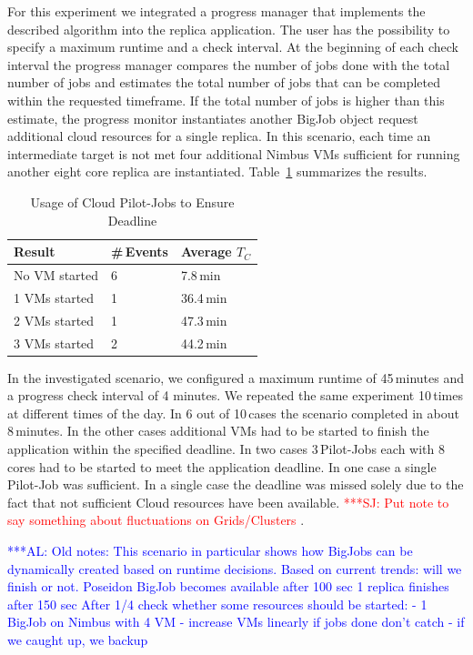 \documentclass[conference,final]{IEEEtran}
\newcommand{\tc}{$T_{C}$ }
\newcommand{\alnote}[1]{ {\textcolor{blue} { ***AL: #1 }}}
\newcommand{\jhanote}[1]{ {\textcolor{red} { ***SJ: #1 }}}
\newcommand{\alnote}[1]{}
\newcommand{\jhanote}[1]{}
\begin{document}
For this experiment we integrated a progress manager that implements
the described algorithm into the replica application.
The user has the possibility to specify a maximum runtime and a check interval.
At the beginning of each check interval the progress manager compares the number 
of jobs done with the total number of jobs and estimates the total 
number of jobs that can be completed within the requested timeframe. If the total
number of jobs is higher than this estimate, the progress monitor instantiates
another BigJob object request additional cloud resources for a single replica. 
In this scenario, each time an intermediate target is not met four additional 
Nimbus VMs sufficient for running another eight core replica are instantiated.
Table~\ref{tab:app_deadline} summarizes the results.

\begin{table}[ht]
    \centering
	\begin{tabular}{|l|l|l|}
	\hline
    Result & \#\,Events &Average \tc \\ \hline
	No VM started &6 &7.8\,min\\ \hline
	1 VMs started &1 &36.4\,min\\ \hline
	2 VMs started &1 &47.3\,min\\ \hline
	3 VMs started &2 &44.2\,min\\ \hline
	\end{tabular}
	\caption{Usage of Cloud Pilot-Jobs to Ensure Deadline \label{tab:app_deadline}}
\end{table}

In the investigated scenario, we configured a maximum runtime of
45\,minutes and a progress check interval of 4 minutes. We repeated
the same experiment 10\,times at different times of the day. In 6 out
of 10\,cases the scenario completed in about 8\,minutes. In the other
cases additional VMs had to be started to finish the application
within the specified deadline. In two cases 3\,Pilot-Jobs each with 8
cores had to be started to meet the application deadline. In one case
a single Pilot-Job was sufficient. In a single case the deadline was
missed solely due to the fact that not sufficient Cloud resources have
been available. \jhanote{Put note to say something about fluctuations
  on Grids/Clusters}.

\alnote{Old notes: This scenario in particular shows how BigJobs can
  be dynamically created based on runtime decisions.  Based on current
  trends: will we finish or not.  Poseidon BigJob becomes available
  after 100 sec 1 replica finishes after 150 sec After 1/4 check
  whether some resources should be started: - 1 BigJob on Nimbus with
  4 VM - increase VMs linearly if jobs done don't catch - if we caught
  up, we backup}
\end{document}
